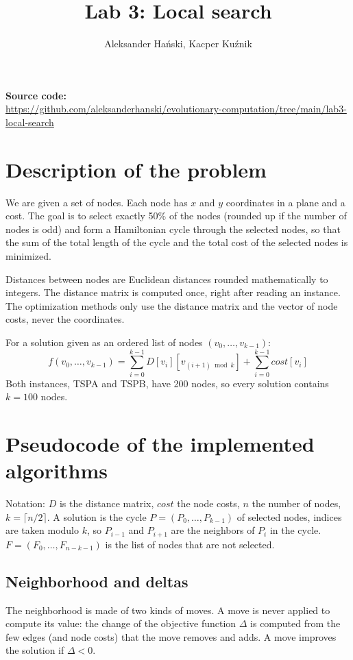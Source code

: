 \documentclass[11pt,a4paper]{article}
\title{Lab 3: Local search}
\author{Aleksander Hański, Kacper Kuźnik}
\date{}
\begin{document}
\maketitle

\textbf{Source code:}\\
\url{https://github.com/aleksanderhanski/evolutionary-computation/tree/main/lab3-local-search}

\section{Description of the problem}

We are given a set of nodes. Each node has $x$ and $y$ coordinates in a plane and a cost. The goal
is to select exactly 50\% of the nodes (rounded up if the number of nodes is odd) and form a
Hamiltonian cycle through the selected nodes, so that the sum of the total length of the cycle and
the total cost of the selected nodes is minimized.

Distances between nodes are Euclidean distances rounded mathematically to integers. The distance
matrix is computed once, right after reading an instance. The optimization methods only use the
distance matrix and the vector of node costs, never the coordinates.

For a solution given as an ordered list of nodes $(v_0, \dots, v_{k-1})$:
\[
  f(v_0, \dots, v_{k-1}) = \sum_{i=0}^{k-1} D[v_i][v_{(i+1) \bmod k}] + \sum_{i=0}^{k-1} \mathit{cost}[v_i]
\]
Both instances, TSPA and TSPB, have 200 nodes, so every solution contains $k = 100$ nodes.

\section{Pseudocode of the implemented algorithms}

Notation: $D$ is the distance matrix, $\mathit{cost}$ the node costs, $n$ the number of nodes,
$k = \lceil n/2 \rceil$. A solution is the cycle $P = (P_0, \dots, P_{k-1})$ of selected nodes,
indices are taken modulo $k$, so $P_{i-1}$ and $P_{i+1}$ are the neighbors of $P_i$ in the cycle.
$F = (F_0, \dots, F_{n-k-1})$ is the list of nodes that are not selected.

\subsection*{Neighborhood and deltas}
The neighborhood is made of two kinds of moves. A move is never applied to compute its value: the
change of the objective function $\Delta$ is computed from the few edges (and node costs) that the
move removes and adds. A move improves the solution if $\Delta < 0$.
\end{document}
